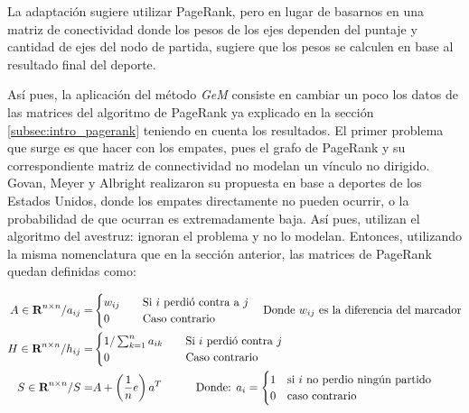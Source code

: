 \par La adaptaci\'on sugiere utilizar PageRank, pero en lugar de basarnos en una
matriz de conectividad donde los pesos de los ejes dependen del puntaje y
cantidad de ejes del nodo de partida, sugiere que los pesos se calculen en base
al resultado final del deporte.

\par As\'i pues, la aplicaci\'on del m\'etodo \emph{GeM} consiste en cambiar un
poco los datos de las matrices del algoritmo de PageRank ya explicado en la
secci\'on \ref{subsec:intro_pagerank} teniendo en cuenta los resultados. El
primer problema que surge es que hacer con los empates, pues el grafo de
PageRank y su correspondiente matriz de connectividad no modelan un v\'inculo no
dirigido. Govan, Meyer y Albright realizaron su propuesta en base a deportes de
los Estados Unidos, donde los empates directamente no pueden ocurrir, o la
probabilidad de que ocurran es extremadamente baja. As\'i pues, utilizan el
algoritmo del avestruz: ignoran el problema y no lo modelan. Entonces,
utilizando la misma nomenclatura que en la secci\'on anterior, las matrices de
PageRank quedan definidas como:

\begin{align}
    A\in\real^{n\times n} / a_{ij} =& \begin{cases}
        w_{ij}\quad&\text{Si  $i$ perdi\'o contra a $j$}\\
        0\quad&\text{Caso contrario}
    \end{cases}\quad\text{Donde $w_{ij}$ es la diferencia del marcador}\\
%
    H\in\real^{n\times n} / h_{ij} =& \begin{cases}
        1/\sum_{k=1}^n a_{ik}\quad&\text{Si $i$ perdi\'o contra $j$}\\
        0\quad&\text{Caso contrario}
    \end{cases}\\
%
    S\in\real^{n\times n} / S =& A + \left(\dfrac{1}{n}e\right)a^T \quad\quad\quad
        \text{Donde: } a_i =
        \begin{cases}
            1 &\text{si $i$ no perdio ning\'un partido}\\
            0 &\text{caso contrario}
        \end{cases}
\end{align}


